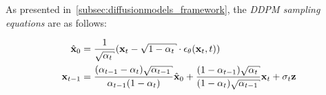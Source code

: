 


As presented in~\ref{subsec:diffusionmodels_framework}, the \emph{DDPM sampling equations} are as follows:

\begin{align*}
  \hat{\x}_0 &= \frac{1}{\sqrt{\alpha_t}}(\x_t - \sqrt{1 - \alpha_t} \cdot \epsilon_\theta(\x_t, t)) \\
  \x_{t-1} &= \frac{(\alpha_{t-1}-\alpha_t) \sqrt{\alpha_{t-1}}}{\alpha_{t-1}(1 - \alpha_t)} \hat{\x}_0 + \frac{(1-\alpha_{t-1})\sqrt{\alpha_t}}{(1 - \alpha_t)\sqrt{\alpha_{t-1}}} \x_t + \sigma_t \z
\end{align*}


